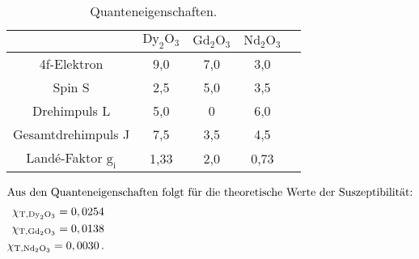 \begin{table}[H]
    \centering
    \caption{Quanteneigenschaften.} 
    \label{Tabelle7}
    \begin{tabular} {c|  c  c  c  c}
        \toprule
        { } &
        {$\text{Dy}_{2}\text{O}_{3}$} &
        {$\text{Gd}_{2}\text{O}_{3}$} &
        {$\text{Nd}_{2}\text{O}_{3}$} \\
        \midrule
        4f-Elektron                        & 9,0  & 7,0 & 3,0  \\
        Spin S                             & 2,5  & 5,0 & 3,5  \\
        Drehimpuls L                       & 5,0  & 0   & 6,0  \\
        Gesamtdrehimpuls J                 & 7,5  & 3,5 & 4,5  \\
        Landé-Faktor $\text{g}_{\text{i}}$ & 1,33 & 2,0 & 0,73 \\
        \bottomrule
    \end{tabular} 
\end{table}

\begin{align*}
    \intertext{Aus den Quanteneigenschaften folgt für die theoretische Werte der Suszeptibilität:}
    \chi_{\text{T},\text{Dy}_{2}\text{O}_{3}} = 0,0254 \\
    \chi_{\text{T},\text{Gd}_{2}\text{O}_{3}} = 0,0138 \\
    \chi_{\text{T},\text{Nd}_{2}\text{O}_{3}} = 0,0030\,. 
\end{align*}